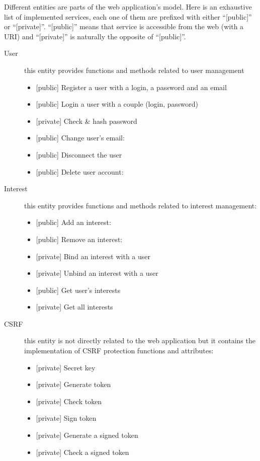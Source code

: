 \documentclass[a4paper,11pt,openany]{report}
\begin{document}
Different entities are parts of the web application's model. Here is an exhaustive list of implemented 
services, each one of them are prefixed with either ``[public]'' or ``[private]''. ``[public]'' means that 
service is accessible from the web (with a URI) and ``[private]'' is naturally the opposite of ``[public]''.
\begin{description}
 \item[User] this entity provides functions and methods related to user management
 \begin{itemize}[label=--]
  \item {[}public{]} Register a user with a login, a password and an email
  \item {[}public{]} Login a user with a couple (login, password)
  \item {[}private{]} Check \& hash password
  \item {[}public{]} Change user's email: \color{red}{vulnerable to CSRF attack}\color{black}{}
  \item {[}public{]} Disconnect the user
  \item {[}public{]} Delete user account: \color{green}{protected against CSRF attack}\color{black}{}
 \end{itemize}
 
 \item[Interest] this entity provides functions and methods related to interest management:
 \begin{itemize}[label=--]
  \item {[}public{]} Add an interest: \color{green}{protected against CSRF attack}\color{black}{}
  \item {[}public{]} Remove an interest: \color{red}{vulnerable to CSRF attack}\color{black}{}
  \item {[}private{]} Bind an interest with a user
  \item {[}private{]} Unbind an interest with a user
  \item {[}public{]} Get user's interests
  \item {[}private{]} Get all interests
 \end{itemize}

 \item[CSRF] this entity is not directly related to the web application but it contains the 
 implementation of CSRF protection functions and attributes:
 \begin{itemize}[label=--]
  \item {[}private{]} Secret key
  \item {[}private{]} Generate token
  \item {[}private{]} Check token
  \item {[}private{]} Sign token
  \item {[}private{]} Generate a signed token
  \item {[}private{]} Check a signed token
 \end{itemize}

\end{description}
\end{document}
